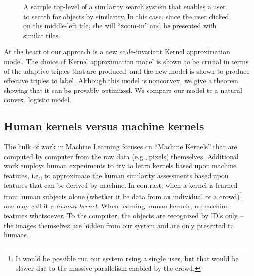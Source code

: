 \documentclass{article}
\begin{document}
\begin{figure}
 \caption{\label{fig:tilestree} A sample top-level of a similarity search system that enables a user to search for objects by similarity.  In this case, since the user clicked on the middle-left tile, she will ``zoom-in'' and be presented with similar tiles.}
\end{figure}

At the heart of our approach is a new scale-invariant Kernel approximation model.  The choice of Kernel approximation model is shown to be crucial in terms of the adaptive triples that are produced, and the new model is shown to produce effective triples to label.  Although this model is nonconvex, we give a theorem showing that it can be provably optimized.  We compare our model to a natural convex, logistic model.

\subsection{Human kernels versus machine kernels}
The bulk of work in Machine Learning focuses on ``Machine Kernels'' that are computed by computer from the raw data (e.g., pixels) themselves.
Additional work employs human experiments to try to learn kernels based upon machine features, i.e., to approximate the human similarity assessments based upon features that can be derived by machine.  In contrast, when a kernel is learned from human subjects alone (whether it be data from an individual or a crowd)\footnote{It would be possible run our system using a single user, but that would be slower due to the massive parallelism enabled by the crowd.} one may call it a {\em human kernel}.  When learning human kernels,  no machine features whatsoever. To the computer, the objects are recognized by ID's only -- the images themselves are hidden from our system and are only presented to humans.
\end{document}

